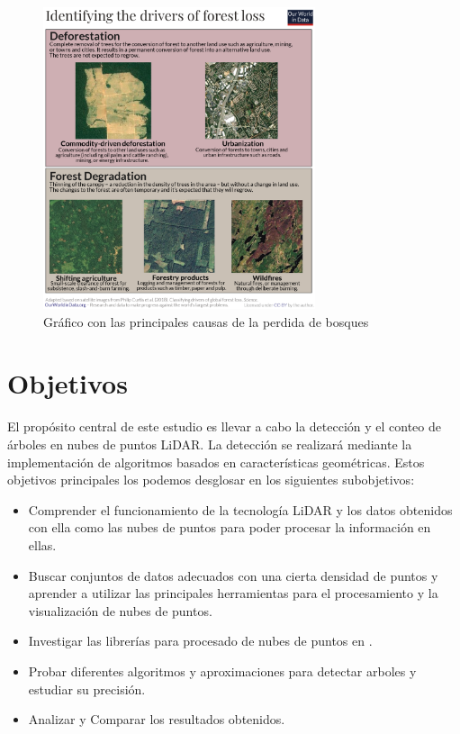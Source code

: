 \begin{figure}[h]
\centering
\includegraphics[width=8cm]{imaxes/Identifying-drivers-of-forest-loss.png}
\caption{Gráfico con las principales causas de la perdida de bosques}
\label{fig:drivers of forest lost}
\end{figure}

\section{Objetivos}
\label{sec:Objetivos}

El propósito central de este estudio es llevar a cabo la detección y el conteo de árboles en nubes de puntos LiDAR. La detección se realizará mediante la implementación de algoritmos basados en características geométricas. Estos objetivos principales los podemos desglosar en los siguientes subobjetivos:

\begin{itemize}
    \item Comprender el funcionamiento de la tecnología LiDAR y los datos obtenidos con ella como las nubes de puntos para poder procesar la información en ellas.
    \item Buscar conjuntos de datos adecuados con una cierta densidad de puntos y aprender a utilizar las principales herramientas para el procesamiento y la visualización de nubes de puntos.
    \item Investigar las librerías para procesado de nubes de puntos en .
    \item Probar diferentes algoritmos y aproximaciones para detectar arboles y estudiar su precisión.
    \item Analizar y Comparar los resultados obtenidos.
\end{itemize}

